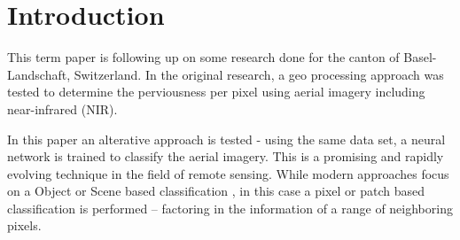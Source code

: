 

\section{Introduction}
\label{introduction}

This term paper is following up on some research done for the canton of Basel-Landschaft, Switzerland.
In the original research, a geo processing approach was tested to determine the perviousness
per pixel using aerial imagery including near-infrared (NIR).


In this paper an alterative approach is tested - using the same data set, 
a neural network is trained to classify the aerial imagery.
This is a promising and rapidly evolving technique in the field of remote sensing.
While modern approaches focus on a Object or Scene based classification \autocite{thapaDeepLearningRemote2023},
in this case a pixel or patch based classification is performed -- factoring in the information of a range of neighboring pixels.

